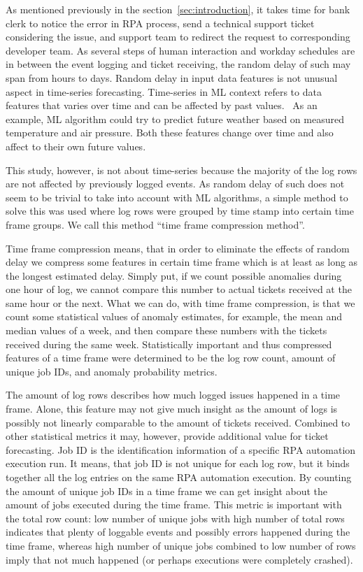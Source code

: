 As mentioned previously in the section~\ref{sec:introduction},
it takes time for bank clerk to notice the error in RPA process,
send a technical support ticket considering the issue,
and support team to redirect the request to corresponding developer team.
As several steps of human interaction and workday schedules
are in between the event logging and ticket receiving,
the random delay of such may span from hours to days.
Random delay in input data features
is not unusual aspect in time-series forecasting.
Time-series in ML context
refers to data features that varies over time
and can be affected by past values.~\cite{palma2016time}
As an example,
ML algorithm could try to predict future weather
based on measured temperature and air pressure.
Both these features change over time
and also affect to their own future values.

This study, however,
is not about time-series
because the majority of the log rows
are not affected by previously logged events.
As random delay of such
does not seem to be trivial to take into account
with ML algorithms,
a simple method to solve this was used
where log rows were grouped by time stamp
into certain time frame groups.
We call this method \enquote{time frame compression method}.

Time frame compression means,
that in order to eliminate the effects of random delay
we compress some features in certain time frame
which is at least as long as the longest estimated delay.
Simply put,
if we count possible anomalies during one hour of log,
we cannot compare this number to actual tickets received
at the same hour or the next.
What we can do,
with time frame compression,
is that we count some statistical values of anomaly estimates,
for example, the mean and median values of a week,
and then compare these numbers with the tickets received
during the same week.
Statistically important and thus compressed features of a time frame
were determined to be the log row count,
amount of unique job IDs, and anomaly probability metrics.

The amount of log rows describes
how much logged issues happened in a time frame.
Alone,
this feature may not give much insight
as the amount of logs is possibly not linearly comparable
to the amount of tickets received.
Combined to other statistical metrics
it may, however,
provide additional value for ticket forecasting.
Job ID is the identification information of a specific RPA automation execution run.
It means,
that job ID is not unique for each log row,
but it binds together all the log entries on the same RPA automation execution.
By counting the amount of unique job IDs in a time frame
we can get insight about the amount of jobs executed during the time frame.
This metric is important with the total row count:
low number of unique jobs with high number of total rows
indicates that plenty of loggable events and possibly errors happened during the time frame,
whereas high number of unique jobs combined to low number of rows
imply that not much happened (or perhaps executions were completely crashed).

